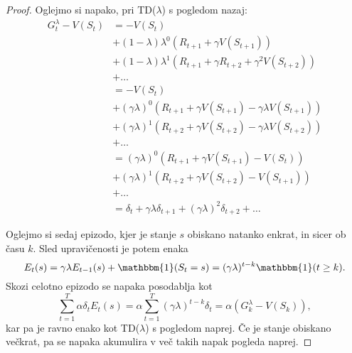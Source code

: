 \documentclass[12pt,a4paper]{amsart}
\theoremstyle{definition} %
\theoremstyle{plain} %
\begin{document}
\begin{proof} 
    Oglejmo si napako, pri TD($\lambda$) s pogledom nazaj:
    \begin{align*}
    G_t^\lambda - V(S_t) &= - V(S_t) \\
                         &+ (1 - \lambda) \lambda^0 (R_{t+1} + \gamma V(S_{t+1})) \\
                         &+ (1 - \lambda) \lambda^1 (R_{t+1} + \gamma R_{t+2} + 
                                \gamma^2 V(S_{t+2})) \\
                         &+ \dots \\
                         &= - V(S_t) \\
                         &+ (\gamma \lambda)^0 (R_{t+1} + \gamma V(S_{t+1}) - 
                                \gamma \lambda V(S_{t+1})) \\
                         &+ (\gamma \lambda)^1 (R_{t+2} + \gamma V(S_{t+2}) - 
                                \gamma \lambda V(S_{t+2})) \\
                         &+ \dots \\
                         &= (\gamma \lambda)^0 (R_{t+1} + \gamma V(S_{t+1}) - V(S_t)) \\
                         &+ (\gamma \lambda)^1 (R_{t+2} + \gamma V(S_{t+2}) - V(S_{t+1})) \\
                         &+ \dots \\
                         &= \delta_t + \gamma \lambda \delta_{t+1} + 
                                (\gamma \lambda)^2 \delta_{t+2} + \dots
    \end{align*}

    Oglejmo si sedaj epizodo, kjer je stanje $s$ obiskano natanko enkrat, in sicer ob času $k$. 
    Sled upravičenosti je potem enaka 
    $$
    E_t(s) = \gamma \lambda E_{t-1}(s) + \mathbbm{1}(S_t = s) = (\gamma \lambda)^{t-k} 
    \mathbbm{1}(t \geq k).
    $$
    Skozi celotno epizodo se napaka posodablja kot 
    $$
    \sum_{t=1}^T \alpha \delta_t E_t(s) = \alpha \sum_{t=1}^T (\gamma \lambda)^{t-k} \delta_t =
    \alpha (G_k^\lambda - V(S_k)),
    $$
    kar pa je ravno enako kot TD($\lambda$) s pogledom naprej. Če je stanje obiskano večkrat, pa
    se napaka akumulira v več takih napak pogleda naprej.
\end{proof}
\end{document}
